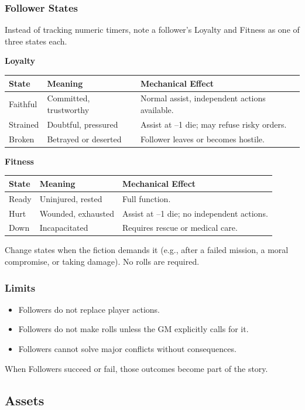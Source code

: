 \subsubsection{Follower States}
Instead of tracking numeric timers, note a follower's Loyalty and Fitness as one of three states each.

\textbf{Loyalty}
\begin{tabular}{@{}lll@{}}
\toprule
\textbf{State} & \textbf{Meaning} & \textbf{Mechanical Effect} \\
\midrule
Faithful & Committed, trustworthy & Normal assist, independent actions available. \\
Strained & Doubtful, pressured & Assist at --1 die; may refuse risky orders. \\
Broken & Betrayed or deserted & Follower leaves or becomes hostile. \\
\bottomrule
\end{tabular}

\textbf{Fitness}
\begin{tabular}{@{}lll@{}}
\toprule
\textbf{State} & \textbf{Meaning} & \textbf{Mechanical Effect} \\
\midrule
Ready & Uninjured, rested & Full function. \\
Hurt & Wounded, exhausted & Assist at --1 die; no independent actions. \\
Down & Incapacitated & Requires rescue or medical care. \\
\bottomrule
\end{tabular}

Change states when the fiction demands it (e.g., after a failed mission, a moral compromise, or taking damage). No rolls are required.

\subsubsection{Limits}
\begin{itemize}
  \item Followers do not replace player actions.
  \item Followers do not make rolls unless the GM explicitly calls for it.
  \item Followers cannot solve major conflicts without consequences.
\end{itemize}
When Followers succeed or fail, those outcomes become part of the story.

\subsection{Assets}

